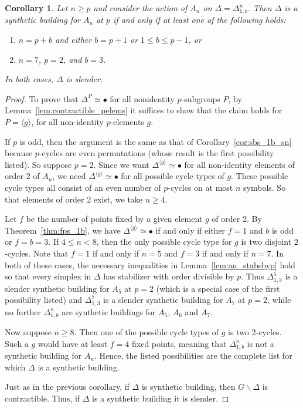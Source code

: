 \documentclass[12pt]{amsart}
\theoremstyle{plain}
\newtheorem{corollary}[theorem]{Corollary}
\theoremstyle{definition}
\theoremstyle{remark}
\numberwithin{equation}{section}
\newcommand{\bs}{\backslash}
\begin{document}
\begin{corollary}\label{cor:sbs_1b_an}
Let $n\ge p$ and consider the action of $A_n$ on $\Delta=\Delta^n_{1,b}$.
Then $\Delta$ is a synthetic building for $A_n$ at $p$
if and only if at least one of the following holds:
    \begin{enumerate}[(1)]
        \item $n=p+b$ and either $b=p+1$ or $1\le b\le p-1$, or %
        \item $n=7$, $p=2$, and $b=3$.
    \end{enumerate}
In both cases, $\Delta$ is slender.
\end{corollary}
\begin{proof}
     To prove that $\Delta^P\simeq \bullet$ for all nonidentity $p$-subgroups $P$, by Lemma~\ref{lem:contractible_pelems} it suffices to show that the claim holds for $P=\langle g\rangle$, for all non-identity $p$-elements $g$.

    If $p$ is odd, then the argument is the same as that of Corollary~\ref{cor:sbs_1b_sn} because $p$-cycles are even permutations (whose result is the first possibility listed). So suppose $p=2$. Since we want $\Delta^{\langle g\rangle}\simeq \bullet$ for all non-identity elements of order 2 of $A_n$, we need $\Delta^{\langle g\rangle}\simeq \bullet$ for all possible cycle types of $g$. These possible cycle types all consist of an even number of $p$-cycles on at most $n$ symbols. So that elements of order 2 exist, we take $n\geq 4$.

    Let $f$ be the number of points fixed by a given element $g$ of order 2. By Theorem~\ref{thm:fps_1b}, we have $\Delta^{\langle g\rangle}\simeq \bullet$ if and only if either $f=1$ and $b$ is odd or $f=b=3$. If $4\leq n<8$, then the only possible cycle type for $g$ is two disjoint $2$-cycles. Note that $f=1$ if and only if $n=5$ and $f=3$ if and only if $n=7$. In both of these cases, the necessary inequalities in Lemma~\ref{lem:an_stabsbyp} hold so that every simplex in $\Delta$ has stabilizer with order divisible by $p$.
    Thus $\Delta^5_{1,3}$ is a slender synthetic building for $A_5$ at $p=2$ (which is a special case of the first possibility listed) and $\Delta^7_{1,3}$ is a slender synthetic building for $A_7$ at $p=2$, while no further $\Delta^n_{1,b}$ are synthetic buildings for $A_5$, $A_6$ and $A_7$.

    Now suppose $n\geq8$. Then one of the possible cycle types of $g$ is two 2-cycles. Such a $g$ would have at least $f=4$ fixed points, meaning that $\Delta^n_{1,b}$ is not a synthetic building for $A_n$. Hence, the listed possibilities are the complete list for which $\Delta$ is a synthetic building.

    Just as in the previous corollary, if $\Delta$ is synthetic building, then  $G\bs\Delta$ is contractible. Thus, if $\Delta$ is a synthetic building it is slender.
\end{proof}
\end{document}
